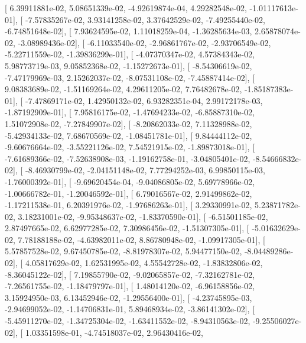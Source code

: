 \documentclass{article}
\begin{document}
       [  6.39911881e-02,   5.08651339e-02,  -4.92619874e-04,
          4.29282548e-02,  -1.01117613e-01],
       [ -7.57835267e-02,   3.93141258e-02,   3.37642529e-02,
         -7.49255440e-02,  -6.74851648e-02],
       [  7.93624595e-02,   1.11018259e-04,  -1.36285634e-03,
          2.65878074e-02,  -3.08989436e-02],
       [ -6.11033540e-02,  -2.96861767e-02,  -2.93706549e-02,
         -5.22711559e-02,  -1.39836299e-01],
       [ -4.07370347e-02,   4.57384343e-02,   5.98773719e-03,
          9.05852368e-02,  -1.15272673e-01],
       [ -8.54306619e-02,  -7.47179969e-03,   2.15262037e-02,
         -8.07531108e-02,  -7.45887414e-02],
       [  9.08383689e-02,  -1.51169264e-02,   4.29611205e-02,
          7.76482678e-02,  -1.85187383e-01],
       [ -7.47869171e-02,   1.42950132e-02,   6.93282351e-04,
          2.99172178e-03,  -1.87192909e-01],
       [  7.95816175e-02,  -1.47694233e-02,  -6.85887310e-02,
          1.51072908e-02,  -7.27849907e-02],
       [ -8.20862033e-02,   7.11328988e-02,  -5.42934133e-02,
          7.68670569e-02,  -1.08451781e-01],
       [  9.84444112e-02,  -9.60676664e-02,  -3.55221126e-02,
          7.54521915e-02,  -1.89873018e-01],
       [ -7.61689366e-02,  -7.52638908e-03,  -1.19162758e-01,
         -3.04805401e-02,  -8.54666832e-02],
       [ -8.46930799e-02,  -2.04151148e-02,   7.77294252e-03,
          6.99850115e-03,  -1.76000392e-01],
       [ -9.69620454e-04,  -9.04086805e-02,   5.69778966e-02,
         -1.00666782e-01,  -1.20046592e-01],
       [  6.79016567e-02,   2.91499862e-02,  -1.17211538e-01,
          6.20391976e-02,  -1.97686263e-01],
       [  3.29330991e-02,   5.23871782e-02,   3.18231001e-02,
         -9.95348637e-02,  -1.83370590e-01],
       [ -6.51501185e-02,   2.87497665e-02,   6.62977285e-02,
          7.30986456e-02,  -1.51307305e-01],
       [ -5.01632629e-02,   7.78188188e-02,  -4.63982011e-02,
          8.86780948e-02,  -1.09917305e-01],
       [  5.57857528e-02,   9.67450785e-02,  -8.81978307e-02,
          5.94477150e-02,  -8.04489286e-02],
       [  4.05817629e-02,   1.62531995e-02,   4.55542728e-02,
         -1.83832806e-02,  -8.36045122e-02],
       [  7.19855790e-02,  -9.02065857e-02,  -7.32162781e-02,
         -7.26561755e-02,  -1.18479797e-01],
       [  1.48014120e-02,  -6.96158856e-02,   3.15924950e-03,
          6.13452946e-02,  -1.29556400e-01],
       [ -4.23745895e-03,  -2.94699052e-02,  -1.14706831e-01,
          5.89468934e-02,  -3.86141302e-02],
       [ -5.45911270e-02,  -1.34725304e-02,  -1.63411552e-02,
         -8.94310563e-02,  -9.25506027e-02],
       [  1.03351598e-01,  -4.74518037e-02,   2.96430416e-02,
\end{document}
